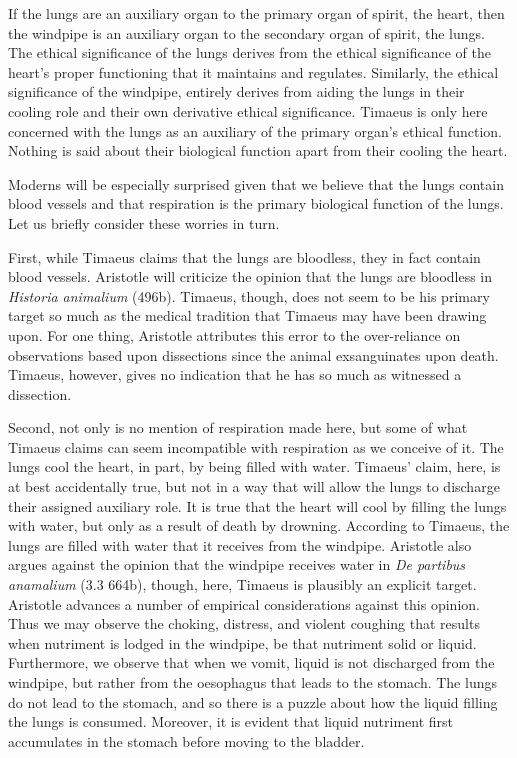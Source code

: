 If the lungs are an auxiliary organ to the primary organ of spirit, the heart, then the windpipe is an auxiliary organ to the secondary organ of spirit, the lungs. The ethical significance of the lungs derives from the ethical significance of the heart's proper functioning that it maintains and regulates. Similarly, the ethical significance of the windpipe, entirely derives from aiding the lungs in their cooling role and their own derivative ethical significance. Timaeus is only here concerned with the lungs as an auxiliary of the primary organ's ethical function. Nothing is said about their biological function apart from their cooling the heart. 

Moderns will be especially surprised given that we believe that the lungs contain blood vessels and that respiration is the primary biological function of the lungs. Let us briefly consider these worries in turn. 

First, while Timaeus claims that the lungs are bloodless, they in fact contain blood vessels. Aristotle will criticize the opinion that the lungs are bloodless in \emph{Historia animalium} (496b). Timaeus, though, does not seem to be his primary target so much as the medical tradition that Timaeus may have been drawing upon. For one thing, Aristotle attributes this error to the over-reliance on observations based upon dissections since the animal exsanguinates upon death. Timaeus, however, gives no indication that he has so much as witnessed a dissection. 

Second, not only is no mention of respiration made here, but some of what Timaeus claims can seem incompatible with respiration as we conceive of it. The lungs cool the heart, in part, by being filled with water. Timaeus' claim, here, is at best accidentally true, but not in a way that will allow the lungs to discharge their assigned auxiliary role. It is true that the heart will cool by filling the lungs with water, but only as a result of death by drowning. According to Timaeus, the lungs are filled with water that it receives from the windpipe. Aristotle also argues against the opinion that the windpipe receives water in \emph{De partibus anamalium} (3.3 664b), though, here, Timaeus is plausibly an explicit target. Aristotle advances a number of empirical considerations against this opinion. Thus we may observe the choking, distress, and violent coughing that results when nutriment is lodged in the windpipe, be that nutriment solid or liquid. Furthermore, we observe that when we vomit, liquid is not discharged from the windpipe, but rather from the oesophagus that leads to the stomach. The lungs do not lead to the stomach, and so there is a puzzle about how the liquid filling the lungs is consumed. Moreover, it is evident that liquid nutriment first accumulates in the stomach before moving to the bladder.

